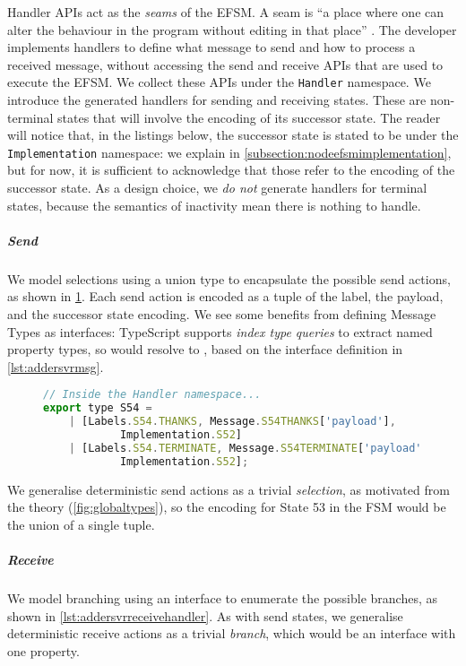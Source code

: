 Handler APIs act as the \textit{seams} of the EFSM.
A seam is ``a place where one can alter the
behaviour in the program without editing in that place''
\cite{seam}. The developer implements handlers
to define what message to send and how to process a received
message, without accessing the send and receive APIs
that are used to execute the EFSM.
We collect these APIs under the \texttt{Handler} namespace. 
We introduce the generated handlers for sending and receiving states.
These are non-terminal states that will involve the encoding of its
successor state. The reader will notice that, in the listings below,
the successor state is stated to be under the
\texttt{Implementation} namespace: we explain in 
\cref{subsection:nodeefsmimplementation}, but for now,
it is sufficient to acknowledge that those refer to the encoding
of the successor state.
As a design choice, we \textit{do not} generate handlers for
terminal states, because the semantics of inactivity mean
there is nothing to handle.

\subparagraph{Send}
We model selections using a union type to
encapsulate the possible send actions, as shown in 
\cref{lst:addersvrsendhandler}.
Each send action is encoded as a tuple of
the label, the payload, and the successor state encoding.
We see some benefits from defining Message Types as interfaces:
TypeScript supports \textit{index type queries} to extract
named property types, so
would resolve to \lstonelinejs{[string]},
based on the interface definition in \cref{lst:addersvrmsg}.

\begin{figure}[!ht]
\begin{lstlisting}[language=javascript, tabsize=2]
// Inside the Handler namespace...
export type S54 = 
	| [Labels.S54.THANKS, Message.S54THANKS['payload'],
			Implementation.S52] 
	| [Labels.S54.TERMINATE, Message.S54TERMINATE['payload'], 
			Implementation.S52];
\end{lstlisting}
\label{lst:addersvrsendhandler}
\end{figure}

We generalise deterministic send actions as a trivial \textit{selection}, 
as motivated from the theory (\cref{fig:globaltypes}),
so the encoding for State 53 in the  FSM would be
the union of a single tuple.

\subparagraph{Receive}
We model branching using an interface to 
enumerate the possible branches, as shown in
\cref{lst:addersvrreceivehandler}.
As with send states,
we generalise deterministic receive actions as a trivial \textit{branch},
which would be an interface with one property. 

